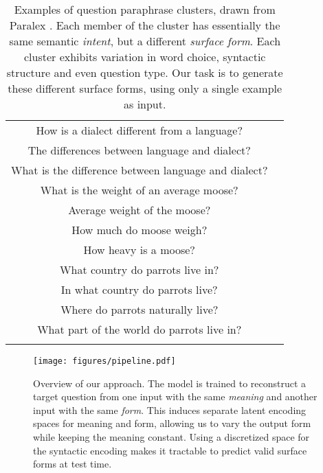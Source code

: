 \documentclass[11pt,a4paper]{article}
\begin{document}
\begin{table}[t]
    \centering
    \small
    \begin{tabular}{cc}
        \hhline{=}
        How is a dialect different from a language? \\
        The differences between language and dialect? \\
        What is the difference between language and dialect? \\
        
        
\hhline{=}
        What is the weight of an average moose? \\
        Average weight of the moose? \\
        How much do moose weigh? \\
        How heavy is a moose? \\
        


        


\hhline{=}
        What country do parrots live in? \\
        In what country do parrots live? \\ 
        Where do parrots naturally live? \\
        What part of the world do parrots live in? \\
        \hhline{=}
        
\end{tabular}
\caption{Examples of question paraphrase clusters, drawn from Paralex \cite{fader-etal-2013-paraphrase}. Each member of the cluster has essentially the same semantic \textit{intent}, but a different \textit{surface form}. Each cluster exhibits variation in word choice, syntactic structure and even question type. Our task is to generate these different surface forms, using only a single example as input.} 
    \label{tab:intro}
\end{table}











\begin{figure*}[ht]
    \centering

    \texttt{[image: figures/pipeline.pdf]}
\caption{Overview of our approach. The model is trained to
      reconstruct a target question from one input with the same
      \textit{meaning} and another input with the same
      \textit{form}. This induces separate latent encoding spaces for
      meaning and form, allowing us to vary the output form while
      keeping the meaning constant. Using a discretized space for the syntactic encoding makes it tractable to predict valid surface forms at test time.}
    \label{fig:pipeline}
\end{figure*}
\end{document}
